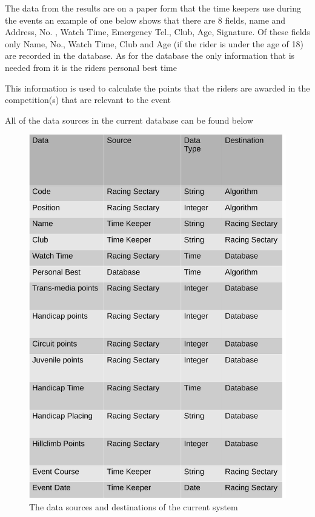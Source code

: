 The data from the results are on a paper form that the time keepers use during the events an example of one below shows that there are 8 fields, name and Address, No. , Watch Time, Emergency Tel., Club, Age, Signature. Of these fields only Name, No., Watch Time, Club and Age (if the rider is under the age of 18) are recorded in the database. As for the database the only information that is needed from it is the riders personal best time

This information is used to calculate the points that the riders are awarded in the competition(s) that are relevant to the event

All of the data sources in the current database can be found below

\begin{figure}[H]
    \includegraphics[width=\textwidth]{./DataSources.pdf}
    \caption{The data sources and destinations of the current system} \label{fig:Data_Sources}
\end{figure}



